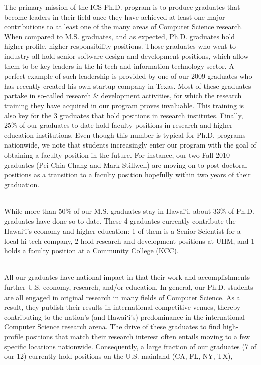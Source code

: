 \documentclass[12pt]{article}
\begin{document}
The primary mission of the ICS Ph.D. program is to produce graduates
that become leaders in their field once they have achieved at least
one major contributions to at least one of the many areas of Computer
Science research.  When compared to M.S. graduates, and as 
expected, Ph.D. graduates hold higher-profile, higher-responsibility
positions.  Those graduates who went to industry all hold senior
software design and development positions, which allow them to be key
leaders in the hi-tech and information technology sector. A
perfect example of such leadership is provided by one of our 2009 graduates
who has recently created his own startup company in Texas. Most of
these graduates partake in so-called research \& development
activities, for which the research training they have acquired in our
program proves invaluable.  This training is also key for the 3
graduates that hold positions in research institutes.  Finally, 25\%
of our graduates to date hold faculty positions in research and higher
education institutions. Even though this number is typical for Ph.D.
programs nationwide, we note that students increasingly
enter our program with the goal of obtaining a faculty position in the
future. For instance, our two Fall 2010 graduates (Pei-Chia Chang and
Mark Stillwell) are moving on to post-doctoral positions as a
transition to a faculty position hopefully within two years of their graduation.

~\\
 While more than 50\% of
our M.S. graduates stay in Hawai`i, about 33\% of Ph.D. graduates have
done so to date.  These 4 graduates currently contribute the Hawai`i's
economy and higher education: 1 of them is a Senior Scientist for a
local hi-tech company, 2 hold research and development positions
at UHM, and 1 holds a faculty position at a Community College (KCC). 

~\\
 All our graduates have
national impact in that their work and accomplishments further U.S.
economy, research, and/or education.  In general, our Ph.D. students
are all engaged in original research in many fields of Computer
Science. As a result, they publish their results in international
competitive venues, thereby contributing to the nation's (and
Hawai`i's) predominance in the international Computer Science research
arena.  The drive of these graduates to find high-profile positions
that match their research interest often entails moving to a few
specific locations nationwide.  Consequently, a large fraction of our
graduates (7 of our 12) currently hold positions on the U.S. mainland
(CA, FL, NY, TX),
\end{document}
